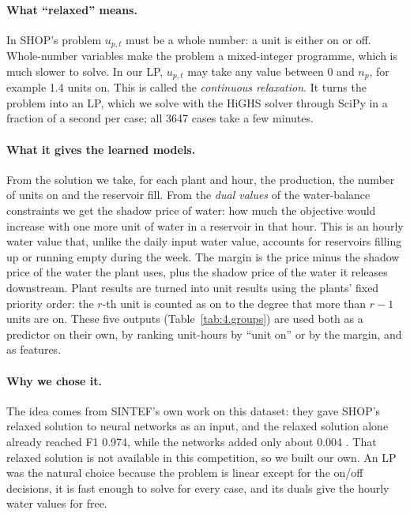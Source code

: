 \paragraph{What ``relaxed'' means.} In SHOP's problem $u_{p,t}$ must be a whole number: a unit is either on or off. Whole-number variables make the problem a mixed-integer programme, which is much slower to solve. In our LP, $u_{p,t}$ may take any value between 0 and $n_p$, for example 1.4 units on. This is called the \emph{continuous relaxation}. It turns the problem into an LP, which we solve with the HiGHS solver through SciPy \citep{huangfu2018highs,virtanen2020scipy} in a fraction of a second per case; all 3647 cases take a few minutes.

\paragraph{What it gives the learned models.} From the solution we take, for each plant and hour, the production, the number of units on and the reservoir fill. From the \emph{dual values} of the water-balance constraints we get the shadow price of water: how much the objective would increase with one more unit of water in a reservoir in that hour. This is an hourly water value that, unlike the daily input water value, accounts for reservoirs filling up or running empty during the week. The margin is the price minus the shadow price of the water the plant uses, plus the shadow price of the water it releases downstream. Plant results are turned into unit results using the plants' fixed priority order: the $r$-th unit is counted as on to the degree that more than $r-1$ units are on. These five outputs (Table~\ref{tab:4.groups}) are used both as a predictor on their own, by ranking unit-hours by ``unit on'' or by the margin, and as features.

\paragraph{Why we chose it.} The idea comes from SINTEF's own work on this dataset: they gave SHOP's relaxed solution to neural networks as an input, and the relaxed solution alone already reached F1 0.974, while the networks added only about 0.004 \citep{barjaktarevic2026}. That relaxed solution is not available in this competition, so we built our own. An LP was the natural choice because the problem is linear except for the on/off decisions, it is fast enough to solve for every case, and its duals give the hourly water values for free.

